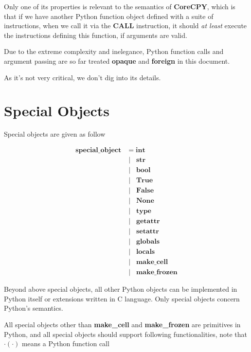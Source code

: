 \documentclass[12pt, a4paper]{report}
\begin{document}
Only one of its properties is relevant to the semantics of \textbf{CoreCPY},
which is that if we have another Python function object defined with a suite of instructions,
when we call it via the \textbf{CALL} instruction,
it should \textit{at least} execute the instructions defining this function, if arguments are valid.

Due to the extreme complexity and inelegance,
Python function calls and argument passing are so far treated \textbf{opaque}
and \textbf{foreign} in this document.

As it's not very critical, we don't dig into its details.

\section* {Special Objects}

Special objects are given as follow

\begin{equation}
\begin{split}
\mathbf{special\_object} & =
                   \mathbf{int}   \\
       & \;|\;\;\; \mathbf{str}   \\
       & \;|\;\;\; \mathbf{bool}  \\
       & \;|\;\;\; \mathbf{True}  \\
       & \;|\;\;\; \mathbf{False} \\
       & \;|\;\;\; \mathbf{None}  \\
       & \;|\;\;\; \mathbf{type}      \\
       & \;|\;\;\; \mathbf{getattr}   \\
       & \;|\;\;\; \mathbf{setattr}   \\
       & \;|\;\;\; \mathbf{globals} \\
       & \;|\;\;\; \mathbf{locals} \\
       & \;|\;\;\; \mathbf{make\_cell} \\
       & \;|\;\;\; \mathbf{make\_frozen}
\end{split}
\end{equation}

Beyond above special objects, all other Python objects can be implemented in Python itself or extensions written in C language. Only special objects concern Python's semantics.

All special objects other than \textbf{make\_cell} and \textbf{make\_frozen} are primitives in Python,
and all special objects should support following functionalities, note that $\cdot(\cdot)$ means a Python function call
\end{document}
